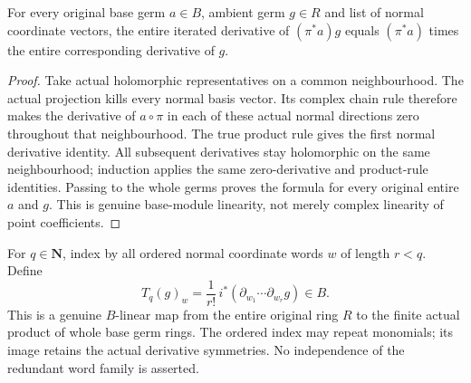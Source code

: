 \begin{lemma}
\label{hir:relative-normal-actual-tangential-linearity}
\leanok
For every original base germ $a\in B$, ambient germ $g\in R$ and list of normal
coordinate vectors, the entire iterated derivative of $(\pi^*a)g$ equals
$(\pi^*a)$ times the entire corresponding derivative of $g$.
\end{lemma}
\begin{proof}
Take actual holomorphic representatives on a common neighbourhood. The actual
projection kills every normal basis vector. Its complex chain rule therefore
makes the derivative of $a\circ\pi$ in each of these actual normal directions
zero throughout that neighbourhood. The true product rule gives the first
normal derivative identity. All subsequent derivatives stay holomorphic on
the same neighbourhood; induction applies the same zero-derivative and
product-rule identities. Passing to the whole germs proves the formula for
every original entire $a$ and $g$. This is genuine base-module linearity,
not merely complex linearity of point coefficients.
\end{proof}

\begin{definition}
\label{hir:relative-normal-actual-coefficient-map}
\leanok
For $q\in\mathbf N$, index by all ordered normal coordinate words $w$ of length
$r<q$. Define
\[
 T_q(g)_w=\frac1{r!}\,i^*(\partial_{w_1}\cdots\partial_{w_r}g)\in B.
\]
This is a genuine $B$-linear map from the entire original ring $R$ to the
finite actual product of whole base germ rings. The ordered index may repeat
monomials; its image retains the actual derivative symmetries. No independence
of the redundant word family is asserted.
\end{definition}

